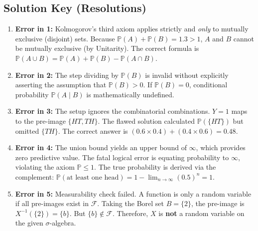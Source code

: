 \documentclass[11pt]{article}
\theoremstyle{definition}
\theoremstyle{plain}
\theoremstyle{remark}
\newcommand{\F}{\mathcal{F}}
\renewcommand{\P}{\mathbb{P}}
\newcommand{\1}{\mathbf{1}}
\begin{document}
\subsection{Solution Key (Resolutions)}
\begin{enumerate}
    \item \textbf{Error in 1:} Kolmogorov's third axiom applies strictly and \textit{only} to mutually exclusive (disjoint) sets. Because $\P(A) + \P(B) = 1.3 > 1$, $A$ and $B$ cannot be mutually exclusive (by Unitarity). The correct formula is $\P(A \cup B) = \P(A) + \P(B) - \P(A \cap B)$.
    \item \textbf{Error in 2:} The step dividing by $\P(B)$ is invalid without explicitly asserting the assumption that $\P(B) > 0$. If $\P(B) = 0$, conditional probability $\P(A \mid B)$ is mathematically undefined.
    \item \textbf{Error in 3:} The setup ignores the combinatorial combinations. $Y=1$ maps to the pre-image $\{HT, TH\}$. The flawed solution calculated $\P(\{HT\})$ but omitted $\{TH\}$. The correct answer is $(0.6 \times 0.4) + (0.4 \times 0.6) = 0.48$.
    \item \textbf{Error in 4:} The union bound yields an upper bound of $\infty$, which provides zero predictive value. The fatal logical error is equating probability to $\infty$, violating the axiom $\P \le 1$. The true probability is derived via the complement: $\P(\text{at least one head}) = 1 - \lim_{n\to\infty}(0.5)^n = 1$.
    \item \textbf{Error in 5:} Measurability check failed. A function is only a random variable if all pre-images exist in $\F$. Taking the Borel set $B = \{2\}$, the pre-image is $X^{-1}(\{2\}) = \{b\}$. But $\{b\} \notin \F$. Therefore, $X$ is \textbf{not} a random variable on the given $\sigma$-algebra.
\end{enumerate}
\end{document}
